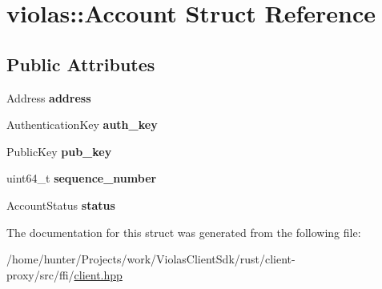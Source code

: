 \hypertarget{structviolas_1_1_account}{}\section{violas\+:\+:Account Struct Reference}
\label{structviolas_1_1_account}
\subsection*{Public Attributes}
\begin{DoxyCompactItemize}
\item 
\mbox{\label{structviolas_1_1_account_a1fd1a06a4abd03b20d8fe1f93268ef07}} 
Address {\bfseries address}
\item 
\mbox{\label{structviolas_1_1_account_af315853afb5e30688b838b326a9a7601}} 
Authentication\+Key {\bfseries auth\+\_\+key}
\item 
\mbox{\label{structviolas_1_1_account_a09773744f6179bc742dc9b6a701e056b}} 
Public\+Key {\bfseries pub\+\_\+key}
\item 
\mbox{\label{structviolas_1_1_account_a9acc19a2ca309d6b878c97dbc4698ef6}} 
uint64\+\_\+t {\bfseries sequence\+\_\+number}
\item 
\mbox{\label{structviolas_1_1_account_afa4b79d13e690c31ef5461526732eeb8}} 
Account\+Status {\bfseries status}
\end{DoxyCompactItemize}


The documentation for this struct was generated from the following file\+:\begin{DoxyCompactItemize}
\item 
/home/hunter/\+Projects/work/\+Violas\+Client\+Sdk/rust/client-\/proxy/src/ffi/\hyperlink{client_8hpp}{client.\+hpp}\end{DoxyCompactItemize}

